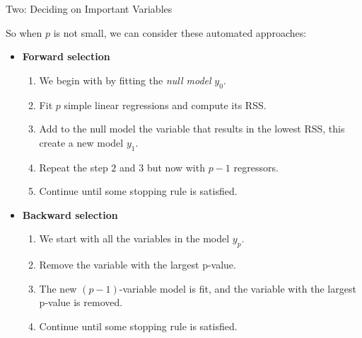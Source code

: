 \begin{frame}{Two: Deciding on Important Variables}

So when $p$ is not small, we can consider these automated approaches: \pause

\begin{itemize}
    \item \textbf{Forward selection} \pause
     \begin{enumerate}
            \item We begin with by fitting the \textit{null model} $y_0$. \pause
            \item Fit $p$ simple linear regressions and compute its RSS. \pause
            \item Add to the null model the variable that results in the lowest RSS, this create a new model $y_1$. \pause
            \item Repeat the step $2$ and $3$ but now with $p-1$ regressors. \pause
            \item Continue until some stopping rule is satisfied. \pause
        \end{enumerate}

    \item \textbf{Backward selection} \pause
     \begin{enumerate}
            \item We start with all the variables in the model $y_p$. \pause
            \item Remove the variable with the largest p-value. \pause
            \item The new $(p - 1)$-variable model is fit, and the variable with the largest p-value is removed. \pause
            \item Continue until some stopping rule is satisfied. 
        \end{enumerate}
        
\end{itemize}
    
\end{frame}


